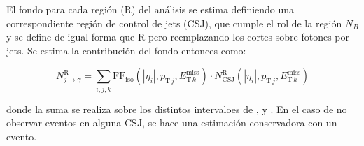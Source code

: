 El fondo para cada región (R) del análisis se estima definiendo una correspondiente región de control de jets (CSJ), que cumple el rol de la región $N_B$ y se define de igual forma que R pero reemplazando los cortes sobre fotones por jets. Se estima la contribución del fondo entonces como:


\begin{equation}
  N^{\text{R}}_{j\rightarrow\gamma} = \sum_{i,j,k} \text{FF}_{\text{iso}}(|\eta_i|, p_{\text{T}\,j}, E_{\text{T}\,k}^{\text{miss}}) \cdot N^{\text{R}}_{\mathrm{CSJ}}(|\eta_i|, p_{\text{T}\,j}, E_{\text{T}\,k}^{\text{miss}})
  \label{eq:jfake_cs}
\end{equation}

\noindent
donde la suma se realiza sobre los distintos intervaloes de \absEta, \pt y \met.
En el caso de no observar eventos en alguna CSJ, se hace una estimación conservadora con un evento.


